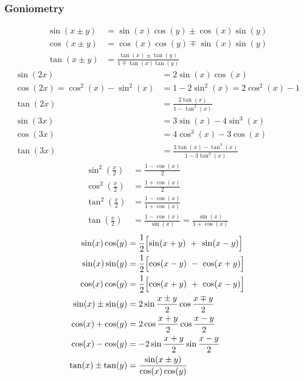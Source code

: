 \subsubsection{Goniometry}
\begin{align*}
    \sin(x\pm y) & =\sin(x)\cos(y)\pm\cos(x)\sin(y)              \\
    \cos(x\pm y) & =\cos(x)\cos(y)\mp\sin(x)\sin(y)              \\
    \tan(x\pm y) & =\frac{\tan(x)\pm\tan(y)}{1\mp\tan(x)\tan(y)}
\end{align*}
\begin{align*}
    \sin(2x)                     & =2\sin(x)\cos(x)                         \\
    \cos(2x)=\cos^2(x)-\sin^2(x) & =1-2\sin^2(x)=2\cos^2(x)-1               \\
    \tan(2x)                     & =\frac{2\tan(x)}{1-\tan^2(x)}            \\
    \sin(3x)                     & =3\sin(x)-4\sin^3(x)                     \\
    \cos(3x)                     & =4\cos^3(x)-3\cos(x)                     \\
    \tan(3x)                     & =\frac{3\tan(x)-\tan^3(x)}{1-3\tan^2(x)}
\end{align*}
\begin{align*}
    \sin^2\left(\frac x2\right)    & =\frac{1-\cos(x)}{2}                                 \\
    \cos^2\left(\frac x2\right)    & =\frac{1+\cos(x)}{2}                                 \\
    \tan^2\left(\frac{x}{2}\right) & =\frac{1-\cos(x)}{1+\cos(x)}                         \\
    \tan\left(\frac x2\right)      & =\frac{1-\cos(x)}{\sin(x)}=\frac{\sin(x)}{1+\cos(x)}
\end{align*}
\begin{align*}
    \sin(x)\cos(y)      & =\frac12\Bigl[\sin(x+y)~+~\sin(x-y)\Bigr]   \\
    \sin(x)\sin(y)      & =\frac12\Bigl[\cos(x-y)~-~\cos(x+y)\Bigr]   \\
    \cos(x)\cos(y)      & =\frac12\Bigl[\cos(x+y)~+~\cos(x-y)\Bigr]   \\
    \sin(x)\pm\sin(y)   & =2\sin\frac{x\pm y}{2}\cos\frac{x \mp y}{2} \\
    \cos(x)+\cos(y)     & =2\cos\frac{x+y}{2}\cos\frac{x-y}{2}        \\
    \cos(x)-\cos(y)     & =-2\sin\frac{x+y}{2}\sin\frac{x-y}{2}       \\
    \tan(x) \pm \tan(y) & = \frac{\sin(x\pm y)}{\cos(x)\cos(y)}
\end{align*}

